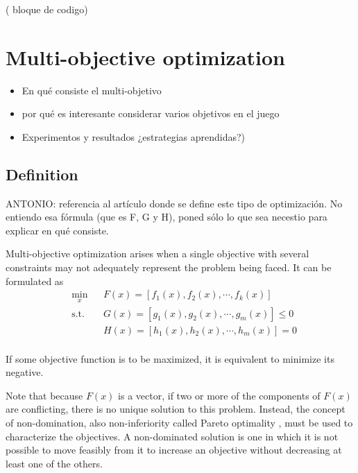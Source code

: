 \documentclass{llncs}
\begin{document}
({\color{red} bloque de codigo})

%
\section{Multi-objective optimization}
\label{sec:sec3}
%

\begin{itemize}
\item En qué consiste el multi-objetivo
\item por qué es interesante considerar varios objetivos en el juego
\item Experimentos y resultados  ¿estrategias aprendidas?)
\end{itemize}

\subsection{Definition}

{\color{red}ANTONIO: referencia al artículo donde se define este tipo de optimización. No entiendo esa fórmula (que es F, G y H), poned sólo lo que sea necestio para explicar en qué consiste.}

Multi-objective optimization arises when a single objective with several constraints may not adequately represent the problem being faced. It can be formulated as
\begin{equation}
\begin{aligned}
& \underset{x}{\text{min}}
& & F(x) = [f_1(x), f_2(x), \cdots, f_k(x)] \\
& \text{s.t.} & &  G(x) = [g_1(x), g_2(x), \cdots, g_m(x)] \leq 0 \\
& & &  H(x) = [h_1(x), h_2(x), \cdots, h_m(x)] = 0 \\
\end{aligned}
\end{equation}

If some objective function is to be maximized, it is equivalent to minimize its negative.

Note that because $F(x)$ is a vector, if two or more of the components of $F(x)$ are conflicting, there is no unique solution to this problem. Instead, the concept of non-domination, also non-inferiority called Pareto optimality \cite{Censor:78}, must be used to characterize the objectives. A non-dominated solution is one in which it is not possible to move feasibly from it to increase an objective without decreasing at least one of the others.
\end{document}
